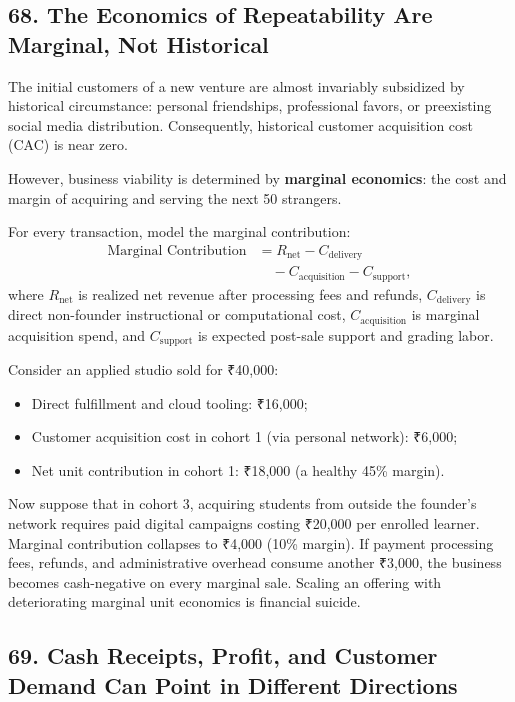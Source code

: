 \subsection*{68. The Economics of Repeatability Are Marginal, Not Historical}

The initial customers of a new venture are almost invariably subsidized by historical circumstance: personal friendships, professional favors, or preexisting social media distribution. Consequently, historical customer acquisition cost (CAC) is near zero.

However, business viability is determined by \textbf{marginal economics}: the cost and margin of acquiring and serving the next 50 strangers.

For every transaction, model the marginal contribution:
\begin{equation}
\begin{aligned}
\text{Marginal Contribution} &= R_{\text{net}} - C_{\text{delivery}} \\
&\quad - C_{\text{acquisition}} - C_{\text{support}},
\end{aligned}
\end{equation}
where $R_{\text{net}}$ is realized net revenue after processing fees and refunds, $C_{\text{delivery}}$ is direct non-founder instructional or computational cost, $C_{\text{acquisition}}$ is marginal acquisition spend, and $C_{\text{support}}$ is expected post-sale support and grading labor.

Consider an applied studio sold for ₹40,000:
\begin{itemize}
    \item Direct fulfillment and cloud tooling: ₹16,000;
    \item Customer acquisition cost in cohort 1 (via personal network): ₹6,000;
    \item Net unit contribution in cohort 1: ₹18,000 (a healthy 45\% margin).
\end{itemize}

Now suppose that in cohort 3, acquiring students from outside the founder's network requires paid digital campaigns costing ₹20,000 per enrolled learner. Marginal contribution collapses to ₹4,000 (10\% margin). If payment processing fees, refunds, and administrative overhead consume another ₹3,000, the business becomes cash-negative on every marginal sale. Scaling an offering with deteriorating marginal unit economics is financial suicide.

\subsection*{69. Cash Receipts, Profit, and Customer Demand Can Point in Different Directions}

